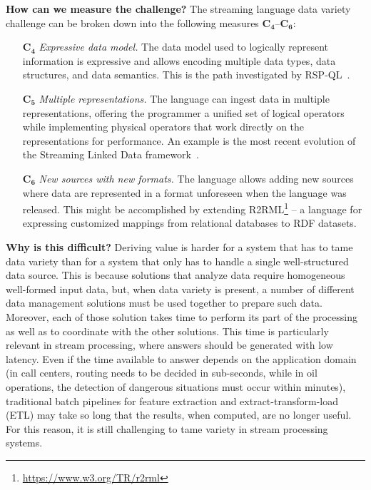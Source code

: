 \textbf{How can we measure the challenge?}
%
The streaming language data variety challenge can be broken down
into the following measures $\mathbf{C_4}$--$\mathbf{C_6}$:

\begin{itemize}[leftmargin=6mm]
  \item[$\mathbf{C_4}$] \emph{Expressive data model.}  The data model
    used to logically represent information is expressive and allows
    encoding multiple data types, data structures, and data
    semantics. This is the path investigated by
    RSP-QL~\cite{DellAglioDataScience2017,DBLP:conf/debs/ValleDM16}.
  \item[$\mathbf{C_5}$] \emph{Multiple representations.} The language
    can ingest data in multiple representations, offering the
    programmer a unified set of logical operators while implementing
    physical operators that work directly on the representations for
    performance. An example is the most recent evolution of the
    Streaming Linked Data framework~\cite{DBLP:conf/esws/BalduiniV017a}.
  \item[$\mathbf{C_6}$] \emph{New sources with new formats.} The
    language allows adding new sources where data are represented in a
    format unforeseen when the language was
    released. This might be accomplished by extending
    R2RML\footnote{\url{https://www.w3.org/TR/r2rml}} -- a language
    for expressing customized mappings from relational databases to
    RDF datasets.
\end{itemize}

\textbf{Why is this difficult?}
%
Deriving value is harder for a system that has to tame data variety
than for a system that only has to handle a single well-structured
data source. This is because solutions that analyze data require
homogeneous well-formed input data, but, when data variety is present,
a number of different data management solutions must be used together
to prepare such data. Moreover, each of those solution takes time to
perform its part of the processing as well as to coordinate with the
other solutions. This time is particularly relevant in stream
processing, where answers should be generated with low latency. Even
if the time available to answer depends on the application domain (in
call centers, routing needs to be decided in sub-seconds, while in oil
operations, the detection of dangerous situations must occur within
minutes), traditional batch pipelines for feature extraction and
extract-transform-load (ETL) may take so long that the results, when
computed, are no longer useful. For this reason, it is still
challenging to tame variety in stream processing systems.
